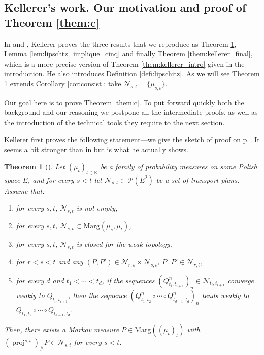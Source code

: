 \documentclass[11pt]{article}
\renewcommand{\theenumi}{\alph{enumi}}
\renewcommand{\theenumii}{\roman{enumii}}
\newenvironment{enumeratei}
{\bgroup\def\theenumi{\roman{enumi}}\def\theenumii{\arabic{enumii}}\begin{enumerate}}
{\end{enumerate}\egroup}
\newcommand{\ldot}{\mathbin{.}}
\theoremstyle{plain}
\newtheorem{them}{Theorem}[section]
\theoremstyle{definition}
\newcommand{\p}{\mathcal{P}}
\newcommand{\ma}{\mathrm{Marg}}
\newcommand{\R}{\mathbb{R}}
\newcommand{\pr}{\operatorname{proj}}
\begin{document}
\subsection{Kellerer's work. Our motivation and proof of Theorem \ref{them:c}}\label{subsec:proof_kelsto}

In \cite{Ke72} and \cite{Ke73}, Kellerer proves the three results that we reproduce as Theorem \ref{them:existence}, Lemma \ref{lem:lipschtz_implique_cinq} and finally Theorem \ref{them:kellerer_final}, which is a more precise version of Theorem \ref{them:kellerer_intro} given in the introduction. He also introduces Definition \ref{defi:lipschitz}. As we will see Theorem \ref{them:existence} extends Corollary \ref{cor:consist}: take $\mathcal{N}_{s,t}=\{\mu_{s,t}\}$.

Our goal here is to prove Theorem \ref{them:c}. To put forward quickly both the background and our reasoning we postpone all the intermediate proofs, as well as the introduction of the technical tools they require to the next section.

Kellerer first proves the following statement---we give the sketch of proof on p.\,\pageref{proof:them:existence}. It seems a bit stronger than in \cite{Ke72} but is what he actually shows.

\begin{them}[{\cite[Th.\,1]{Ke72}}]\label{them:existence}
Let $(\mu_t)_{t\in \R}$ be a family of probability measures on some Polish space $E$, and for every $s< t$ let $\mathcal{N}_{s,t}\subset\p(E^2)$ be a set of transport plans.
Assume that:
\begin{enumeratei}
\item\label{them:existence1}
for every $s,t$, $\mathcal{N}_{s,t}$ is not empty,
\item\label{them:existence2}
for every $s,t$, $\mathcal{N}_{s,t}\subset\ma(\mu_s,\mu_t)$,
\item\label{them:existence3}
for every $s,t$, $\mathcal{N}_{s,t}$ is closed for the weak topology,
\item\label{them:existence4}
for $r<s<t$ and any $(P,P')\in\mathcal{N}_{r,s}\times \mathcal{N}_{s,t}$, $P\ldot P'\in\mathcal{N}_{r,t}$,
\item\label{them:existence5}
 for every $d$ and $t_1<\cdots<t_d$, if the sequences $(Q^n_{t_i,t_{i+1}})_n\in \mathcal{N}_{t_i,t_{i+1}}$ converge weakly to $Q_{t_i,t_{i+1}}$, then the sequence $(Q^n_{t_1,t_2}\circ\cdots \circ Q^n_{t_{d-1},t_d})_{n}$ tends weakly to $Q_{t_1,t_2}\circ\cdots \circ Q_{t_{d-1},t_d}$.
\end{enumeratei}

Then, there exists a Markov measure $P\in\ma((\mu_t)_t)$ with $(\pr^{s,t})_\#P \in \mathcal{N}_{s,t}$ for every $s<t$.
\end{them}
\end{document}
